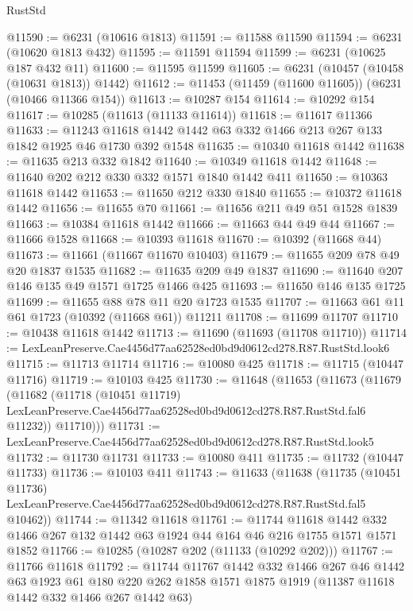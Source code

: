 \begin{lexlean}{RustStd}
\begin{coremodule}
{{@11590 := @6231 (@10616 @1813)
@11591 := @11588 @11590
@11594 := @6231 (@10620 @1813 @432)
@11595 := @11591 @11594
@11599 := @6231 (@10625 @187 @432 @11)
@11600 := @11595 @11599
@11605 := @6231 (@10457 (@10458 (@10631 @1813)) @1442)
@11612 := @11453 (@11459 (@11600 @11605)) (@6231 (@10466 @11366 @154))
@11613 := @10287 @154
@11614 := @10292 @154
@11617 := @10285 (@11613 (@11133 @11614))
@11618 := @11617 @11366
@11633 := @11243 @11618 @1442 @1442 @63 @332 @1466 @213 @267 @133 @1842 @1925 @46 @1730 @392 @1548
@11635 := @10340 @11618 @1442
@11638 := @11635 @213 @332 @1842
@11640 := @10349 @11618 @1442
@11648 := @11640 @202 @212 @330 @332 @1571 @1840 @1442 @411
@11650 := @10363 @11618 @1442
@11653 := @11650 @212 @330 @1840
@11655 := @10372 @11618 @1442
@11656 := @11655 @70
@11661 := @11656 @211 @49 @51 @1528 @1839
@11663 := @10384 @11618 @1442
@11666 := @11663 @44 @49 @44
@11667 := @11666 @1528
@11668 := @10393 @11618
@11670 := @10392 (@11668 @44)
@11673 := @11661 (@11667 @11670 @10403)
@11679 := @11655 @209 @78 @49 @20 @1837 @1535
@11682 := @11635 @209 @49 @1837
@11690 := @11640 @207 @146 @135 @49 @1571 @1725 @1466 @425
@11693 := @11650 @146 @135 @1725
@11699 := @11655 @88 @78 @11 @20 @1723 @1535
@11707 := @11663 @61 @11 @61 @1723 (@10392 (@11668 @61)) @11211
@11708 := @11699 @11707
@11710 := @10438 @11618 @1442
@11713 := @11690 (@11693 (@11708 @11710))
@11714 := LexLeanPreserve.Cae4456d77aa62528ed0bd9d0612cd278.R87.RustStd.look6
@11715 := @11713 @11714
@11716 := @10080 @425
@11718 := @11715 (@10447 @11716)
@11719 := @10103 @425
@11730 := @11648
    (@11653
      (@11673
        (@11679
          (@11682
            (@11718
              (@10451 @11719)
              LexLeanPreserve.Cae4456d77aa62528ed0bd9d0612cd278.R87.RustStd.fal6
              @11232))
          @11710)))
@11731 := LexLeanPreserve.Cae4456d77aa62528ed0bd9d0612cd278.R87.RustStd.look5
@11732 := @11730 @11731
@11733 := @10080 @411
@11735 := @11732 (@10447 @11733)
@11736 := @10103 @411
@11743 := @11633
    (@11638
      (@11735
        (@10451 @11736)
        LexLeanPreserve.Cae4456d77aa62528ed0bd9d0612cd278.R87.RustStd.fal5
        @10462))
@11744 := @11342 @11618
@11761 := @11744
    @11618
    @1442
    @332
    @1466
    @267
    @132
    @1442
    @63
    @1924
    @44
    @164
    @46
    @216
    @1755
    @1571
    @1571
    @1852
@11766 := @10285 (@10287 @202 (@11133 (@10292 @202)))
@11767 := @11766 @11618
@11792 := @11744
    @11767
    @1442
    @332
    @1466
    @267
    @46
    @1442
    @63
    @1923
    @61
    @180
    @220
    @262
    @1858
    @1571
    @1875
    @1919
    (@11387 @11618 @1442 @332 @1466 @267 @1442 @63)
}}
\end{coremodule}
\end{lexlean}

